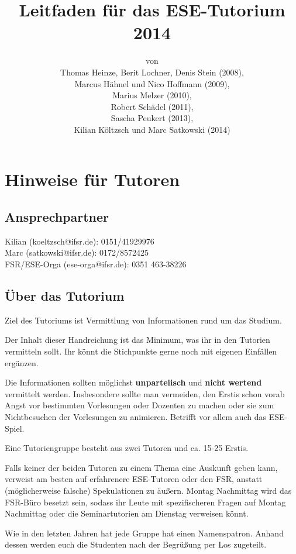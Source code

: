 \documentclass[a4paper,12pt]{report}
\begin{document}
\title{\textbf{Leitfaden für das ESE-Tutorium 2014}\\}
\date{}
\author{von\\Thomas Heinze, Berit Lochner, Denis Stein (2008), \\Marcus Hähnel und Nico Hoffmann (2009), \\Marius Melzer (2010), \\Robert Schädel (2011),\\Sascha Peukert (2013), \\Kilian Költzsch und Marc Satkowski (2014)}
\maketitle

\chapter{Hinweise für Tutoren}
\section{Ansprechpartner}
Kilian (koeltzsch@ifsr.de): 0151/41929976\\
Marc (satkowski@ifsr.de): 0172/8572425 \\
FSR/ESE-Orga (ese-orga@ifsr.de): 0351 463-38226

\section{Über das Tutorium}
\begin{itemize*}
\item Ziel des Tutoriums ist Vermittlung von Informationen rund um das Studium.
\item Der Inhalt dieser Handreichung ist das Minimum, was ihr in den Tutorien vermitteln sollt. Ihr könnt die Stichpunkte gerne noch mit eigenen Einfällen ergänzen.
\item Die Informationen sollten möglichst \textbf{unparteiisch} und \textbf{nicht wertend} vermittelt werden. Insbesondere sollte man vermeiden, den Erstis schon vorab Angst vor bestimmten Vorlesungen oder Dozenten zu machen oder sie zum Nichtbesuchen der Vorlesungen zu animieren. Betrifft vor allem auch das ESE-Spiel.
\item Eine Tutoriengruppe besteht aus zwei Tutoren und ca. 15-25 Erstis.
\item Falls keiner der beiden Tutoren zu einem Thema eine Auskunft geben kann, verweist am besten auf erfahrenere ESE-Tutoren oder den FSR, anstatt (möglicherweise falsche) Spekulationen zu äußern. Montag Nachmittag wird das FSR-Büro besetzt sein, sodass ihr Leute mit spezifischeren Fragen auf Montag Nachmittag oder die Seminartutorien am Dienstag verweisen könnt.
\item Wie in den letzten Jahren hat jede Gruppe hat einen Namenspatron. Anhand dessen werden euch die Studenten nach der Begrüßung per Los zugeteilt.
\end{itemize*}
\end{document}
